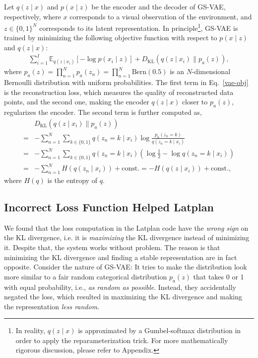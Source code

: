 Let $q(z \mid x)$ and $p(x \mid z)$ be the encoder and the decoder of GS-VAE, respectively,
where $x$ corresponds to a visual observation of the environment, and $z\in\{0,1\}^N$ corresponds to its latent representation.
In principle\footnote{In reality, $q(z\mid x)$ is approximated by a Gumbel-softmax distribution in order to apply the reparameterization trick. For more mathematically rigorous discussion, please refer to Appendix.}, GS-VAE is trained by minimizing the following objective function with respect to $p(x \mid z)$ and $q(z\mid x)$:
\begin{align}
\label{vae-obj} \sum_{i=1}^I \mathbb{E}_{q(z\mid x_i)}\left[-\log p(x_i\mid z)\right] + D_{\mathrm{KL}}(q(z\mid x_i) \parallel p_a(z)),
\end{align}
where $p_a(z) = \prod_{n=1}^N p_a(z_n) = \prod_{n=1}^N \mathrm{Bern}(0.5)$ is an $N$-dimensional Bernoulli distribution with uniform probabilities.
The first term in Eq.~\eqref{vae-obj} is the reconstruction loss, which measures the quality of reconstructed data points,
and the second one, making the encoder $q(z\mid x)$ closer to $p_a(z)$, regularizes the encoder.
The second term is further computed as,
\begin{align*}
 &D_{\mathrm{KL}}(q(z\mid x_i) \parallel p_a(z)) \\
= & - \sum_{n=1}^N \sum_{k\in\{0,1\}}q(z_{n}=k \mid x_i) \log\frac{p_a(z_{n}=k)}{q(z_{n}=k \mid x_i)}\\
=& - \sum_{n=1}^N \sum_{k\in\{0,1\}}q(z_{n}=k \mid x_i) \left(\log \frac{1}{2} - \log{q(z_{n}=k \mid x_i)}\right)\\
=& - \sum_{n=1}^N H(q(z_n\mid x_i)) + \mathrm{const.} = -H(q(z \mid x_i)) + \mathrm{const.},
\end{align*}
where $H(q)$ is the entropy of $q$.

\subsection{Incorrect Loss Function Helped Latplan}

We found that the loss computation in the Latplan code have the \emph{wrong sign} on the KL divergence,
i.e. it is \emph{maximizing} the KL divergence instead of minimizing it.
Despite that, the system works without problem.
% 
The reason is that minimizing the KL divergence and finding a stable representation are in fact opposite.
Consider the nature of GS-VAE:
It tries to make the distribution look more similar to a fair random categorical distribution $p_a(z)$
that takes 0 or 1 with equal probability, i.e., \emph{as random as possible}.
Instead, they accidentally negated the loss, which resulted in
maximizing the KL divergence and making the representation \emph{less random}.

